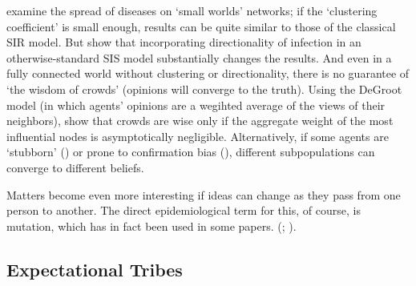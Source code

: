 



\cite{moore2000epidemics} examine the spread of diseases on `small worlds' networks; if the `clustering coefficient' is small enough, results can be quite similar to those of the classical SIR model.  But \cite{allard2020role}  show that incorporating directionality of infection in an otherwise-standard SIS model substantially changes the results.  And even in a fully connected world without clustering or directionality, there is no guarantee of `the wisdom of crowds' (opinions will converge to the truth).  Using the DeGroot model \cite{degroot1974reaching} (in which agents' opinions are a wegihted average of the views of their neighbors), \cite{golub2010naive} show that crowds are wise only if the aggregate weight of the most influential nodes is asymptotically negligible.  Alternatively, if some agents are `stubborn' (\cite{acemouglu2013opinion}) or prone to confirmation bias (\cite{sikder2020minimalistic}), different subpopulations can converge to different beliefs.

Matters become even more interesting if ideas can change as they pass from one person to another.  The direct epidemiological term for this, of course, is mutation, which has in fact been used in some papers.  (\cite{shiller2020popular}; \cite{hanchen_inflation_2017}).

\subsection{Expectational Tribes}\label{subsec:ExpTribes}\hypertarget{ExpTribes}{}

